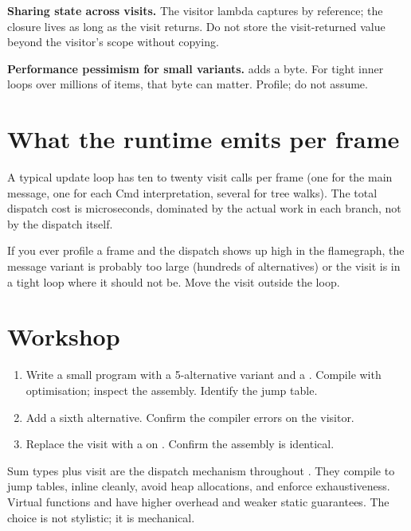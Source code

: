 \begin{warning}
\textbf{Sharing state across visits.} The visitor lambda
captures by reference; the closure lives as long as the visit
returns. Do not store the visit-returned value beyond the
visitor's scope without copying.
\end{warning}

\begin{warning}
\textbf{Performance pessimism for small variants.}
 adds a byte. For tight inner
loops over millions of items, that byte can matter. Profile;
do not assume.
\end{warning}

\section{What the runtime emits per frame}

A typical \maya{} update loop has ten to twenty visit calls per
frame (one for the main message, one for each Cmd
interpretation, several for tree walks). The total dispatch
cost is microseconds, dominated by the actual work in each
branch, not by the dispatch itself.

If you ever profile a frame and the dispatch shows up high in
the flamegraph, the message variant is probably too large
(hundreds of alternatives) or the visit is in a tight loop
where it should not be. Move the visit outside the loop.

\section*{Workshop}

\begin{enumerate}[leftmargin=*]
  \item Write a small program with a 5-alternative variant and
    a . Compile with optimisation; inspect the
    assembly. Identify the jump table.
  \item Add a sixth alternative. Confirm the compiler errors
    on the visitor.
  \item Replace the visit with a  on
    . Confirm the assembly is identical.
\end{enumerate}

\begin{recap}
Sum types plus visit are the dispatch mechanism throughout
\maya{}. They compile to jump tables, inline cleanly, avoid
heap allocations, and enforce exhaustiveness. Virtual functions
and  have higher overhead and weaker static
guarantees. The choice is not stylistic; it is mechanical.
\end{recap}
